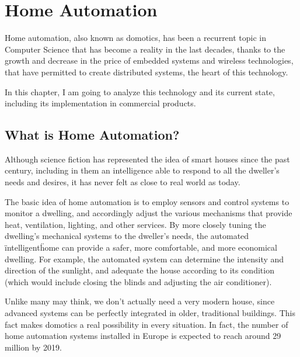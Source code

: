 \chapter{Home Automation}

Home automation, also known as domotics, has been a recurrent topic in Computer Science that
has become a reality in the last decades, thanks to the growth and decrease in the price of embedded
systems and wireless technologies, that have permitted to create distributed systems, the heart of this technology.

In this chapter, I am going to analyze this technology and its current state, including its implementation in commercial
products.

\section{What is Home Automation?}

Although science fiction has represented the idea of smart houses since the past century, including in them
an intelligence able to respond to all the dweller’s needs and desires, it has never felt as close to real world as today.

The basic idea of home automation is to employ sensors and control systems to monitor a dwelling, and accordingly 
adjust the various mechanisms that provide heat, ventilation, lighting, and other services. By more closely tuning the 
dwelling’s mechanical systems to the dweller’s needs, the automated \"intelligent\" home can provide a safer, more 
comfortable, and more economical dwelling.\cite{smarthouse98} For example, the automated system can determine 
the intensity and direction of the sunlight, and adequate the house according to its condition (which would include
closing the blinds and adjusting the air conditioner).

Unlike many may think, we don't actually need a very modern house, since advanced systems can be perfectly integrated 
in older, traditional buildings. This fact makes domotics a real possibility in every situation. In fact, the number of home 
automation systems installed in Europe is expected to reach around 29 million by 2019.\cite{statistaInstalled}


